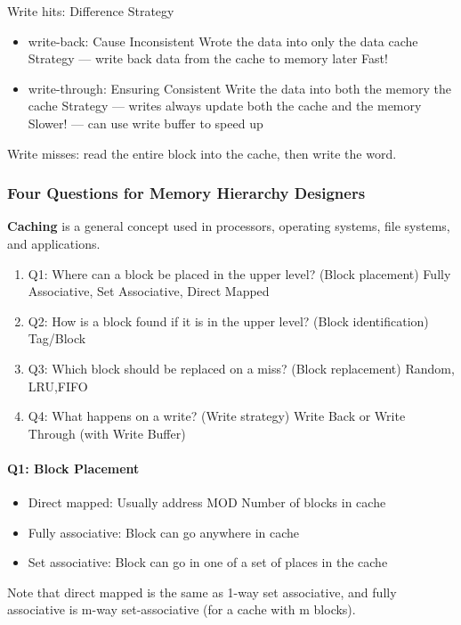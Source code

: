Write hits: Difference Strategy
\begin{itemize}\small
    \item write-back: Cause Inconsistent
    \subitem Wrote the data into only the data cache
    \subitem Strategy --- write back data from the cache to memory later
    \subitem Fast!
    \item  write-through: Ensuring Consistent
    \subitem Write the data into both the memory the cache
    \subitem Strategy --- writes always update both the cache and the memory
    \subitem Slower! --- can use write buffer to speed up 
\end{itemize}

Write misses: read the entire block into the cache, then write the word. 

\subsubsection{Four Questions for Memory Hierarchy Designers}
\textbf{Caching} is a general concept used in processors, operating systems, file systems, and applications.
\begin{enumerate}\small
    \item Q1: Where can a block be placed in the upper level? (Block placement)
    \subitem Fully Associative, Set Associative, Direct Mapped
    \item Q2: How is a block found if it is in the upper level? (Block identification)
    \subitem Tag/Block
    \item Q3: Which block should be replaced on a miss? (Block replacement)
    \subitem Random, LRU,FIFO
    \item Q4: What happens on a write? (Write strategy)
    \subitem Write Back or Write Through (with Write Buffer)
\end{enumerate}

\paragraph{Q1: Block Placement}
\begin{itemize}
    \item Direct mapped: Usually address MOD Number of blocks in cache
    \item Fully associative: Block can go anywhere in cache
    \item Set associative: Block can go in one of a set of places in the cache
\end{itemize}
Note that direct mapped is the same as 1-way set associative, and fully associative is m-way set-associative (for a cache with m blocks).

